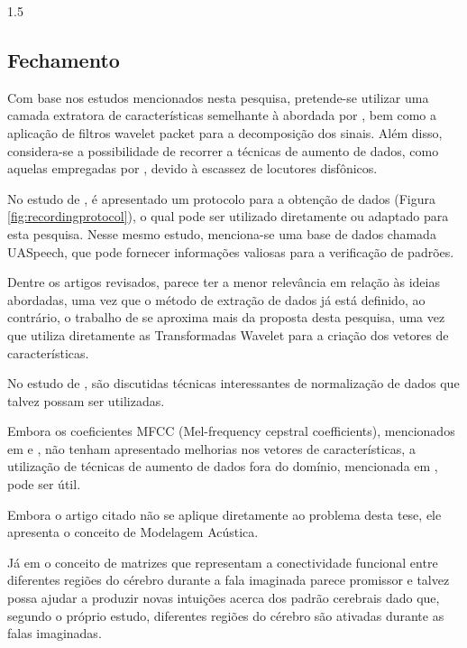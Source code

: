 \documentclass[a4paper,12pt,openright,oneside]{book}
\newenvironment{myenv}[1]
  {\begin{spacing}{#1}}
  {\end{spacing}}
\begin{document}
\begin{myenv}{1.5}
				
				\subsection{Fechamento}
				
					\par Com base nos estudos mencionados nesta pesquisa, pretende-se utilizar uma camada extratora de características semelhante à abordada por \cite{WOS:000841879504172}, bem como a aplicação de filtros wavelet packet para a decomposição dos sinais. Além disso, considera-se a possibilidade de recorrer a técnicas de aumento de dados, como aquelas empregadas por \cite{jin21_interspeech}, devido à escassez de locutores disfônicos.
					
					\par No estudo de \cite{tamm2020classification}, é apresentado um protocolo para a obtenção de dados (Figura \ref{fig:recordingprotocol}), o qual pode ser utilizado diretamente ou adaptado para esta pesquisa. Nesse mesmo estudo, menciona-se uma base de dados chamada UASpeech, que pode fornecer informações valiosas para a verificação de padrões.
					
					\par Dentre os artigos revisados, \cite{WOS:000614122200021} parece ter a menor relevância em relação às ideias abordadas, uma vez que o método de extração de dados já está definido, ao contrário, o trabalho de \cite{WOS:000591530700001} se aproxima mais da proposta desta pesquisa, uma vez que utiliza diretamente as Transformadas Wavelet para a criação dos vetores de características.
					
					\par No estudo de \cite{WOS:000857544900001}, são discutidas técnicas interessantes de normalização de dados que talvez possam ser utilizadas.
					
					Embora os coeficientes MFCC (Mel-frequency cepstral coefficients), mencionados em \cite{furlan2021caracterizacao} e \cite{salim2023automatic}, não tenham apresentado melhorias nos vetores de características, a utilização de técnicas de aumento de dados fora do domínio, mencionada em \cite{salim2023automatic}, pode ser útil.
					
					\par Embora o artigo citado \cite{6296526} não se aplique diretamente ao problema desta tese, ele apresenta o conceito de Modelagem Acústica.
					
					\par Já em \cite{bakhshali2022investigating} o conceito de matrizes que representam a conectividade funcional entre diferentes regiões do cérebro durante a fala imaginada parece promissor e talvez possa ajudar a produzir novas intuições acerca dos padrão cerebrais dado que, segundo o próprio estudo, diferentes regiões do cérebro são ativadas durante as falas imaginadas.
					

\end{myenv}
\end{document}
